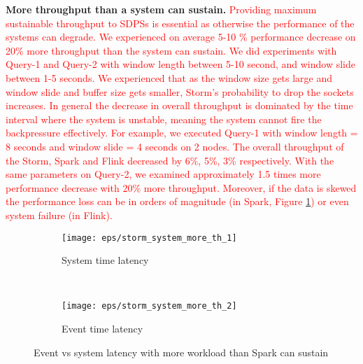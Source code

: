 {\begin{figure*}
	\caption{\textcolor{red}{Comparison between event and system time latency among systems}}
	\label{event_vs_system_latency}
\end{figure*}











\textbf{More throughput  than a system can sustain.}
\textcolor{red}{Providing maximum sustainable throughput to SDPSs is essential as otherwise the performance of the systems can degrade. We experienced on average 5-10 \% performance decrease on 20\% more throughput than the system can sustain. We did experiments with Query-1 and Query-2 with window length between 5-10 second, and window slide between 1-5 seconds. We experienced that as the window size gets large and window slide and buffer size gets smaller, Storm's probability to drop the sockets increases. In general the decrease in overall throughput is dominated by the time interval where the system is unstable, meaning the system cannot fire the backpressure effectively. For example, we executed Query-1 with window length = 8 seconds and window slide = 4 seconds on 2 nodes. The overall throughput of the Storm, Spark and Flink decreased by 6\%, 5\%, 3\%  respectively. With the same parameters on Query-2, we examined approximately 1.5 times more performance decrease with 20\% more throughput. Moreover, if the data is skewed the performance loss can be in orders of magnitude (in Spark, Figure \ref{more_th}) or even system failure (in Flink).   }


\begin{figure}
	\centering
	
	\begin{subfigure}[b]{0.45\textwidth}
		\texttt{[image: eps/storm\_system\_more\_th\_1]}

		
		\caption{System time latency }
	\end{subfigure}
	~ 
	\begin{subfigure}[b]{0.45\textwidth}
		\texttt{[image: eps/storm\_system\_more\_th\_2]}
		
		\caption{Event time latency }
	\end{subfigure}

	
	\caption{Event vs system latency with more workload than Spark can sustain}
	\label{more_th}
\end{figure}



}
